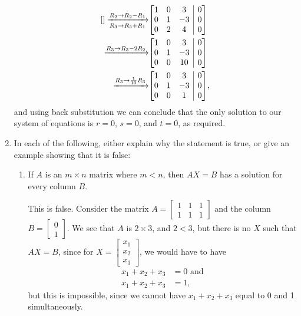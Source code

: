 \documentclass[letterpaper,12pt]{article}
\makeatletter
\newenvironment{amatrix}[1]{%
  \left[\begin{array}{@{}*{#1}{c}|c@{}}
}{%
  \end{array}\right]
}
\makeatother
\begin{document}
\begin{enumerate}
\begin{align*}
\begin{amatrix}{3}
 \end{amatrix} \xrightarrow[R_3\to R_3+R_1]{R_2\to R_2-R_1} 
 &\begin{amatrix}{3}
  1&0&3&0\\0&1&-3&0\\0&2&4&0
 \end{amatrix}\\
\xrightarrow[]{R_3\to R_3-2R_2}
&\begin{amatrix}{3}
 1&0&3&0\\0&1&-3&0\\0&0&10&0
\end{amatrix}\\
\xrightarrow[]{R_3\to\frac{1}{10}R_3}
&\begin{amatrix}{3}
 1&0&3&0\\0&1&-3&0\\0&0&1&0
\end{amatrix},
\end{align*}
and using back substitution we can conclude that the only solution to our system of equations is $r=0$, $s=0$, and $t=0$, as required.

\bigskip

 \item In each of the following, either explain why the statement is true, or give an example showing that it is false:
 \begin{enumerate}
 \item If $A$ is an $m\times n$ matrix where $m<n$, then $AX=B$ has a solution for every column $B$.

\bigskip

This is false. Consider the matrix $A=\begin{bmatrix}1&1&1\\1&1&1\end{bmatrix}$ and the column $B = \begin{bmatrix}0\\1\end{bmatrix}$. We see that $A$ is $2\times 3$, and $2<3$, but there is no $X$ such that $AX=B$, since for $X = \begin{bmatrix}x_1\\x_2\\x_3\end{bmatrix}$, we would have to have
\begin{align*}
 x_1+x_2+x_3&=0 \text{ and}\\
 x_1+x_2+x_3&=1,
\end{align*}
but this is impossible, since we cannot have $x_1+x_2+x_3$ equal to 0 and 1 simultaneously.


\end{enumerate}
\end{enumerate}
\end{document}
